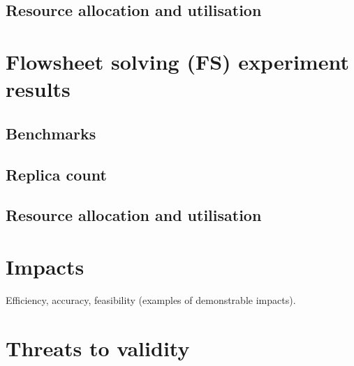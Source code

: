 \subsection{Resource allocation and utilisation}



\section{Flowsheet solving (FS) experiment results}

\subsection{Benchmarks}


\subsection{Replica count}


\subsection{Resource allocation and utilisation}



\section{Impacts}
Efficiency, accuracy, feasibility (examples of demonstrable impacts).
\section{Threats to validity}